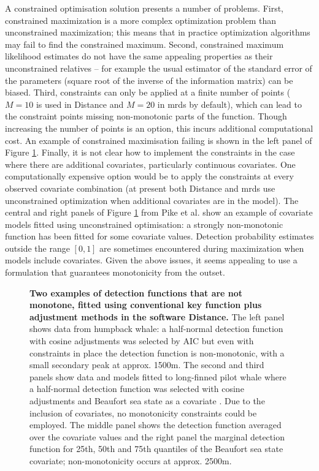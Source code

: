 \documentclass[10pt]{article}
\begin{document}
A constrained optimisation solution presents a number of problems. First, constrained maximization is a more complex optimization problem than unconstrained maximization; this means that in practice optimization algorithms may fail to find the constrained maximum.  Second, constrained maximum likelihood estimates do not have the same appealing properties as their unconstrained relatives -- for example the usual estimator of the standard error of the parameters (square root of the inverse of the information matrix) can be biased.  Third, constraints can only be applied at a finite number of points ($M=10$ is used in Distance and $M=20$ in mrds by default), which can lead to the constraint points missing non-monotonic parts of the function. Though increasing the number of points is an option, this incurs additional computational cost. An example of constrained maximisation failing is shown in the left panel of Figure \ref{fig1}. Finally, it is not clear how to implement the constraints in the case where there are additional covariates, particularly continuous covariates. One computationally expensive option would be to apply the constraints at every observed covariate combination (at present both Distance and mrds use unconstrained optimization when additional covariates are in the model). The central and right panels of Figure \ref{fig1} from Pike et al. \cite{Pike:2003ug} show an example of covariate models fitted using unconstrained optimisation: a strongly non-monotonic function has been fitted for some covariate values. Detection probability estimates outside the range $[0,1]$ are sometimes encountered during maximization when models include covariates. Given the above issues, it seems appealing to use a formulation that guarantees monotonicity from the outset.

\begin{figure}[!ht]
\centering
\caption{
{\bf Two examples of detection functions that are not monotone, fitted using conventional key function plus adjustment methods in the software Distance.} The left panel shows data from humpback whale: a half-normal detection function with cosine adjustments was selected by AIC \cite{Williams:2007tc} but even with constraints in place the detection function is non-monotonic, with a small secondary peak at approx. 1500m. The second and third panels show data and models fitted to long-finned pilot whale where a half-normal detection function was selected with cosine adjustments and Beaufort sea state as a covariate \cite{Pike:2003ug}. Due to the inclusion of covariates, no monotonicity constraints could be employed.  The middle panel shows the detection function averaged over the covariate values and the right panel the marginal detection function for 25th, 50th and 75th quantiles of the Beaufort sea state covariate; non-monotonicity occurs at approx. 2500m.
}
\label{fig1}
\end{figure}
\end{document}
